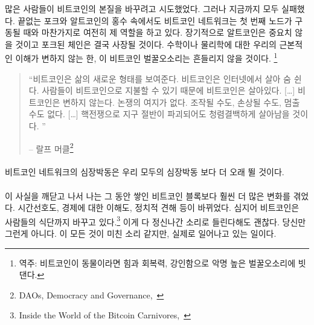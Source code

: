 많은 사람들이 비트코인의 본질을 바꾸려고 시도했었다. 그러나 지금까지 모두 실패했다. 끝없는 포크와 알트코인의 홍수 속에서도
비트코인 네트워크는 첫 번째 노드가 구동될 때와 마찬가지로 여전히 제 역할을 하고 있다.
장기적으로 알트코인은 중요치 않을 것이고 포크된 체인은 결국 사장될 것이다.
수학이나 물리학에 대한 우리의 근본적인 이해가 변하지 않는 한, 이 비트코인 벌꿀오소리는 흔들리지 않을 것이다.
\footnote{역주: 비트코인이 동물이라면 힘과 회복력, 강인함으로 악명 높은 벌꿀오소리에 빗댄다.}

\begin{quotation}\begin{samepage}
		\enquote{비트코인은 삶의 새로운 형태를 보여준다. 비트코인은 인터넷에서 살아 숨 쉰다. 
		사람들이 비트코인으로 지불할 수 있기 때문에 비트코인은 살아있다. [\ldots] 비트코인은 변하지 않는다. 논쟁의 여지가 없다.
		조작될 수도, 손상될 수도, 멈출 수도 없다. [\ldots] 핵전쟁으로 지구 절반이 파괴되어도 청렴결백하게 살아남을 것이다. }
		\begin{flushright} -- 랄프 머클\footnote{DAOs, Democracy and Governance,~\cite{merkle-dao}}
\end{flushright}\end{samepage}\end{quotation}

\paragraph{}
비트코인 네트워크의 심장박동은 우리 모두의 심장박동 보다 더 오래 뛸 것이다.

\paragraph{}
이 사실을 깨닫고 나서 나는 그 동안 쌓인 비트코인 블록보다 훨씬 더 많은 변화를 겪었다.
시간선호도, 경제에 대한 이해도, 정치적 견해 등이 바뀌었다. 
심지어 비트코인은 사람들의 식단까지 바꾸고 있다.\footnote{Inside the World of the Bitcoin Carnivores,~\cite{carnivores}} 
이게 다 정신나간 소리로 들린다해도 괜찮다. 당신만 그런게 아니다.
이 모든 것이 미친 소리 같지만, 실제로 일어나고 있는 일이다.

